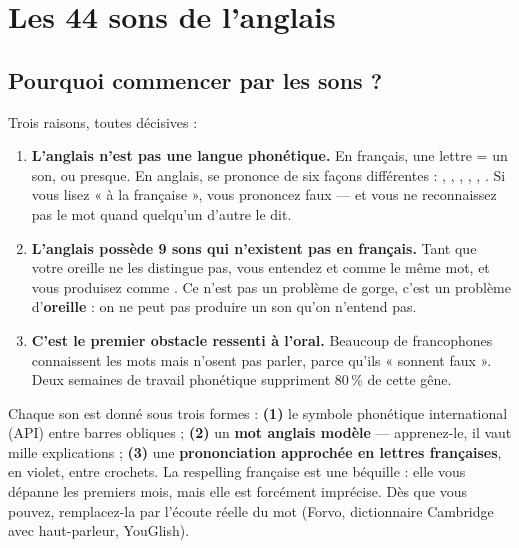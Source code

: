 \chapter{Les 44 sons de l'anglais}

\section{Pourquoi commencer par les sons ?}
Trois raisons, toutes décisives :

\begin{enumerate}
  \item \textbf{L'anglais n'est pas une langue phonétique.} En français, une lettre = un son,
  ou presque. En anglais,  se prononce de six façons différentes :
   ,  ,  ,
   ,  ,  . Si vous lisez
  « à la française », vous prononcez faux --- et vous ne reconnaissez pas le mot quand
  quelqu'un d'autre le dit.
  \item \textbf{L'anglais possède 9 sons qui n'existent pas en français.} Tant que votre
  oreille ne les distingue pas, vous entendez  et  comme le même mot,
  et vous produisez  comme . Ce n'est pas un problème de gorge, c'est un
  problème d'\textbf{oreille} : on ne peut pas produire un son qu'on n'entend pas.
  \item \textbf{C'est le premier obstacle ressenti à l'oral.} Beaucoup de francophones
  connaissent les mots mais n'osent pas parler, parce qu'ils « sonnent faux ». Deux semaines
  de travail phonétique suppriment 80\,\% de cette gêne.
\end{enumerate}

\begin{astuce}
Chaque son est donné sous trois formes :
\textbf{(1)} le symbole phonétique international (API) entre barres obliques ;
\textbf{(2)} un \textbf{mot anglais modèle} --- apprenez-le, il vaut mille explications ;
\textbf{(3)} une \textbf{prononciation approchée en lettres françaises}, en violet, entre
crochets. La respelling française est une béquille : elle vous dépanne les premiers mois,
mais elle est forcément imprécise. Dès que vous pouvez, remplacez-la par l'écoute réelle du
mot (Forvo, dictionnaire Cambridge avec haut-parleur, YouGlish).
\end{astuce}

